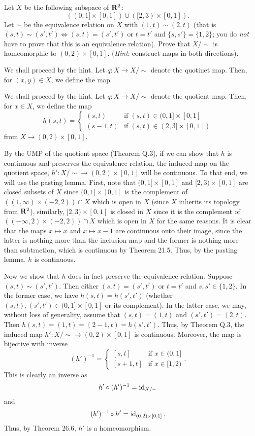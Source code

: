 \begin{problem}
  Let $X$ be the following subspace of $\mathbf{R}^2$:
  \[
    ((0,1]\times[0,1])\cup([2,3)\times[0,1]).
  \]
  Let $\sim$ be the equivalence relation on $X$ with $(1,t)\sim(2,t)$ (that
  is $(s,t)\sim(s',t')\iff(s,t)=(s',t')$ or $t=t'$ and $\{s,s'\}=\{1,2\}$;
  you do \emph{not} have to prove that this is an equivalence
  relation). Prove that $X/{\sim}$ is homeomorphic to
  $(0,2)\times[0,1]$. (\emph{Hint}: construct maps in both directions).
\end{problem}
\begin{solution}
  We shall proceed by the hint. Let $q\colon X\to X/{\sim}$ denote the
  quotinet map. Then, for $(x,y)\in X$, we define the map

  We shall proceed by the hint. Let $q\colon X\to X/{\sim}$ denote the
  quotient map. Then, for $x\in X$, we define the map
  \[
    h(s,t)=
    \begin{cases}
      (s,t)&\text{if $(s,t)\in(0,1]\times[0,1]$}\\
      (s-1,t)&\text{if $(s,t)\in(2,3]\times[0,1])$}
    \end{cases}
  \]
  from $X\to(0,2)\times[0,1]$.

  By the UMP of the quotient space (Theorem Q.3), if we can show that $h$
  is continuous and preserves the equivalence relation, the induced map on
  the quotient space, $h'\colon X/{\sim}\to (0,2)\times[0,1]$ will be
  continuous. To that end, we will use the pasting lemma. First, note that
  $(0,1]\times[0,1]$ and $[2,3)\times[0,1]$ are closed subsets of $X$ since
  $(0,1]\times[0,1]$ is the complement of $((1,\infty)\times (-2,2))\cap X$
  which is open in $X$ (since $X$ inherits its topology from $\mathbf{R}^2$),
  similarly, $[2,3)\times[0,1]$ is closed in $X$ since it is the complement
  of $((-\infty,2)\times(-2,2))\cap X$ which is open in $X$ for the same
  reasons. It is clear that the maps $x\mapsto x$ and $x\mapsto x-1$ are
  continuous onto their image, since the latter is nothing more than the
  inclusion map and the former is nothing more than subtraction, which is
  continuous by Theorem 21.5. Thus, by the pasting lemma, $h$ is
  continuous.

  Now we show that $h$ does in fact preserve the equivalence
  relation. Suppose $(s,t)\sim(s',t')$. Then either $(s,t)=(s',t')$ or
  $t=t'$ and $s,s'\in\{1,2\}$. In the former case, we have
  $h(s,t)=h(s',t')$ (whether $(s,t),(s',t')\in(0,1]\times[0,1]$ or its
  complement). In the latter case, we may, without loss of generality,
  assume that $(s,t)=(1,t)$ and $(s',t')=(2,t)$. Then
  $h(s,t)=(1,t)=(2-1,t)=h(s',t')$. Thus, by Theorem Q.3, the induced map
  $h'\colon X/{\sim}\to(0,2)\times[0,1]$ is continuous. Moreover, the map
  is bijective with inverse
  \[
    (h')^{-1}=
    \begin{cases}
      [s,t]&\text{if $x\in (0,1]$}\\
      [s+1,t]&\text{if $x\in [1,2)$}
    \end{cases}.
  \]
  This is clearly an inverse as
  \[
    h'\circ (h')^{-1}=\operatorname{id}_{X/{\sim}}
  \]
  and
  \[
    (h')^{-1}\circ h'=\operatorname{id}_{(0,2)\times[0,1]}.
  \]
  Thus, by Theorem 26.6, $h'$ is a homeomorphism.
\end{solution}

